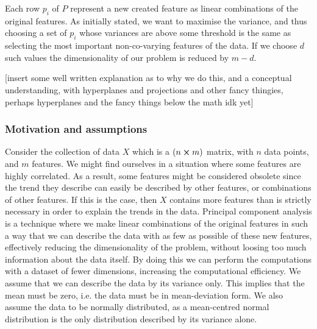     Each row $p_i$ of $P$ represent a new created feature as linear combinations of the original features. As initially stated, we want to maximise the variance, and thus choosing a set of $p_i$ whose variances are above some threshold is the same as selecting the most important non-co-varying features of the data. If we choose $d$ such values the dimensionality of our problem is reduced by $m-d$.
    



    [insert some well written explanation as to why we do this, and a conceptual understanding, with hyperplanes and projections and other fancy thingies, perhaps hyperplanes and the fancy things below the math idk yet]

    \subsubsection{Motivation and assumptions}
        Consider the collection of data $X$ which is a $(n\cross m)$ matrix, with $n$ data points, and $m$ features. We might find ourselves in a situation where some features are highly correlated. As a result, some features might be considered obsolete since the trend they describe can easily be described by other features, or combinations of other features. If this is the case, then $X$ contains more features than is strictly necessary in order to explain the trends in the data. Principal component analysis is a technique where we make linear combinations of the original features in such a way that we can describe the data with as few as possible of these new features, effectively reducing the dimensionality of the problem, without loosing too much information about the data itself. By doing this we can perform the computations with a dataset of fewer dimensions, increasing the computational efficiency. We assume that we can describe the data by its variance only. This implies that the mean must be zero, i.e. the data must be in mean-deviation form. We also assume the data to be normally distributed, as a mean-centred normal distribution is the only distribution described by its variance alone.
        
